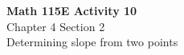 \documentclass[12pt]{article}
\begin{document}
\begin{center}
    \Large \textbf{Math 115E Activity 10} \\
    \vspace{0.2cm}
    \normalsize Chapter 4 Section 2 \\
    \normalsize Determining slope from two points
\end{center}

\begin{comment}
\noindent
ALL UNIQUE SLOPES (Total: 10 pairs)
\\
$[-13.0, -4.0, -2.0, -1.0,  0.0, $
$   2.0,  3.0,  5.0, 7.0, 20.0]$

\noindent
\begin{tabular}{ |c|c|c|c|c|c|c|c|c|c| } 
 \hline
 -13 & -4 & -2 & -1 & 0 & 2 & 3 & 5 & 7 & 20 \\
 \hline
 A & B & C & D & E & F & G & H & I & J  \\ 
 \hline
\end{tabular}     
\\
\noindent
POINTS: $(0,15),(3,9),(-3,9),(-4,-5),(2,-11)$\\
KEY: I\_LIKE\_BONUS\_POINTS (OLD)
\end{comment}
\end{document}
